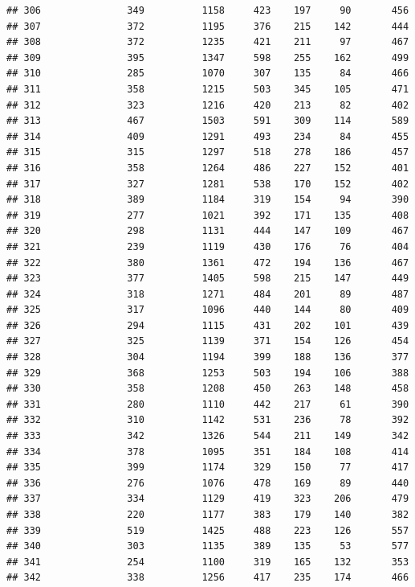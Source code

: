 \documentclass[]{book}
\begin{document}
\begin{verbatim}
## 306               349          1158     423    197     90       456
## 307               372          1195     376    215    142       444
## 308               372          1235     421    211     97       467
## 309               395          1347     598    255    162       499
## 310               285          1070     307    135     84       466
## 311               358          1215     503    345    105       471
## 312               323          1216     420    213     82       402
## 313               467          1503     591    309    114       589
## 314               409          1291     493    234     84       455
## 315               315          1297     518    278    186       457
## 316               358          1264     486    227    152       401
## 317               327          1281     538    170    152       402
## 318               389          1184     319    154     94       390
## 319               277          1021     392    171    135       408
## 320               298          1131     444    147    109       467
## 321               239          1119     430    176     76       404
## 322               380          1361     472    194    136       467
## 323               377          1405     598    215    147       449
## 324               318          1271     484    201     89       487
## 325               317          1096     440    144     80       409
## 326               294          1115     431    202    101       439
## 327               325          1139     371    154    126       454
## 328               304          1194     399    188    136       377
## 329               368          1253     503    194    106       388
## 330               358          1208     450    263    148       458
## 331               280          1110     442    217     61       390
## 332               310          1142     531    236     78       392
## 333               342          1326     544    211    149       342
## 334               378          1095     351    184    108       414
## 335               399          1174     329    150     77       417
## 336               276          1076     478    169     89       440
## 337               334          1129     419    323    206       479
## 338               220          1177     383    179    140       382
## 339               519          1425     488    223    126       557
## 340               303          1135     389    135     53       577
## 341               254          1100     319    165    132       353
## 342               338          1256     417    235    174       466

\end{verbatim}
\end{document}
